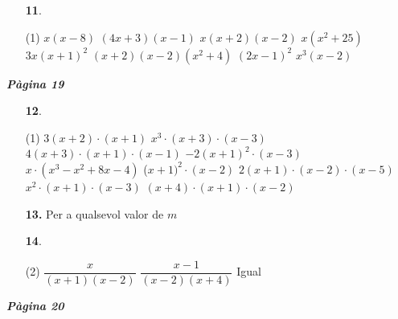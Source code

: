 \documentclass[a4paper, pdf, twoside]{book}
\begin{document}
\begin{multicols}{2}
\begin{enumerate}

 \item[\fontfamily{phv}\selectfont\color{blue}\textbf{11}. ] 
 \begin{tasks}[column-sep=1em, item-indent=1.3333em](1)
	 \task $x(x-8)$
	 \task $(4x+3)(x-1)$
	 \task $x(x+2)(x-2)$
	 \task $x(x^2+25)$
	 \task $3x(x+1)^2$
	 \task $(x+2)(x-2)(x^2+4)$
	 \task $(2x-1)^2$
	 \task $x^3(x-2)$
\end{tasks}
 \end{enumerate}
\vspace{0.3cm}


{\textbf{\em Pàgina 19}} \hrulefill
\begin{enumerate}
\vspace{0.25cm}



 \item[\fontfamily{phv}\selectfont\color{blue}\textbf{12}. ]  \scalebox{0.6}{\simbolclau } 
 \begin{tasks}[column-sep=1em, item-indent=1.3333em](1)
	 \task  $3(x+2)\cdot (x+1)$
	 \task $x^{3}\cdot (x+3)\cdot (x-3)$
	 \task $4(x+3)\cdot (x+1)\cdot (x-1)$
	 \task $-2(x+1)^{2}\cdot (x-3)$
	 \task $x\cdot (x^{3}-x^{2}+8x-4)$
	 \task ($x+1)^{2}\cdot (x-2)$
	 \task $2(x+1)\cdot (x-2)\cdot (x-5)$
	 \task $x^{2}\cdot (x+1)\cdot (x-3)$
	 \task $(x+4)\cdot (x+1)\cdot (x-2)$ 
\end{tasks}
 \end{enumerate}
\begin{enumerate}
\vspace{0.25cm}
\item[\fontfamily{phv}\selectfont\color{blue}\textbf{13. }] 
Per a qualsevol valor de $m$
\vspace{0.25cm}



 \item[\fontfamily{phv}\selectfont\color{blue}\textbf{14}. ] 
 \begin{tasks}[column-sep=1em, item-indent=1.3333em](2)
	 \task $\dfrac {x}{(x+1)(x-2)}$
	 \task $\dfrac {x-1}{(x-2)(x+4)}$
	 \task Igual
\end{tasks}
 \end{enumerate}
\vspace{0.3cm}


{\textbf{\em Pàgina 20}} \hrulefill
\begin{enumerate}
\vspace{0.25cm}



\end{enumerate}
\end{multicols}
\end{document}
